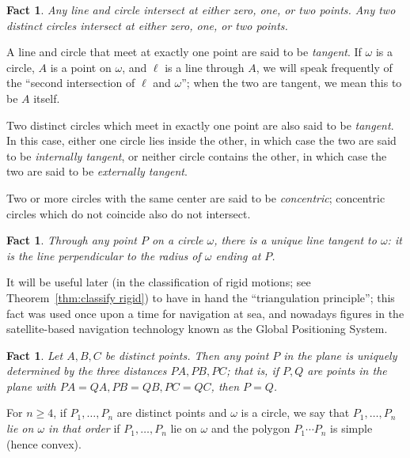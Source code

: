 \documentclass[12pt]{book}
\numberwithin{exc}{section}
\numberwithin{figure}{section}
\newtheorem{fact}[theorem]{Fact}
\numberwithin{equation}{theorem}
\begin{document}
\begin{fact} \label{fact:intersect line circle}
Any line and circle intersect at either zero, one, or two points.
Any two distinct circles intersect at either zero, one, or two points.
\end{fact}
A line and circle that meet at exactly one point are said to be
\emph{tangent}. 
If $\omega$ is a circle, $A$ is a point on $\omega$, and $\ell$ is a line
through $A$, we will speak frequently of the ``second 
intersection  of
$\ell$ and $\omega$''; when the two are tangent, we mean this to be $A$ itself.

Two distinct circles which meet in exactly one point are also said to be
\emph{tangent}. In this case, either one circle lies inside the other, in
which case the two are said to be \emph{internally tangent}, 
or neither circle
contains the other, in which case the two are said to be 
\emph{externally tangent}.

Two or more circles with the same center are said to be \emph{concentric};
 concentric circles which do not 
coincide also do not intersect.

\begin{fact}
Through any point $P$ on a circle $\omega$, 
there is a unique line tangent to $\omega$:
it is the line perpendicular to the radius of $\omega$ ending at $P$.
\end{fact}

It will be useful later (in the classification of rigid motions; see
Theorem~\ref{thm:classify rigid}) to have in hand the ``triangulation
principle'';   
this fact was used once upon a time for navigation at sea, and nowadays figures in the satellite-based navigation technology known as the Global Positioning System. 
\begin{fact} \label{fact:triangulation principle}
Let $A,B,C$ be distinct points. Then any point $P$ in the plane
is uniquely determined by the three distances $PA, PB, PC$; that is, if
$P,Q$ are points in the plane with $PA=QA, PB=QB, PC=QC$, then
$P=Q$. 
\end{fact}

For $n \geq 4$, if $P_1, \dots, P_n$ are distinct points and $\omega$ is a circle,
we say that \emph{$P_1, \dots, P_n$ lie on $\omega$ in that order}
if $P_1, \dots, P_n$ lie on $\omega$ and the polygon
$P_1\cdots P_n$ is simple (hence convex).
\end{document}
